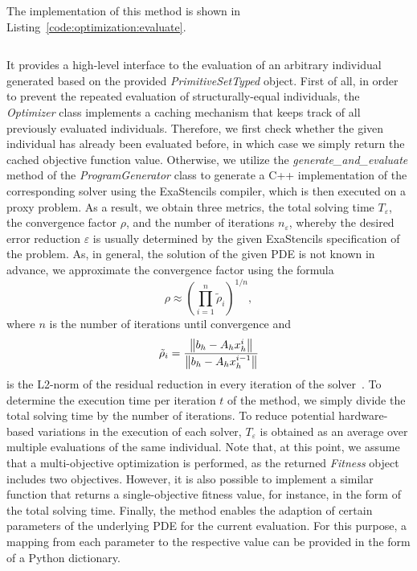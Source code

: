 The implementation of this method is shown in Listing~\ref{code:optimization:evaluate}.
\begin{listing}
	\inputminted[fontsize=\footnotesize,breaklines]{scala}{evostencils/optimization/evaluate.py}
	\caption{}
	\label{code:optimization:evaluate}
\end{listing}
It provides a high-level interface to the evaluation of an arbitrary individual generated based on the provided \emph{PrimitiveSetTyped} object.
First of all, in order to prevent the repeated evaluation of structurally-equal individuals, the \emph{Optimizer} class implements a caching mechanism that keeps track of all previously evaluated individuals.
Therefore, we first check whether the given individual has already been evaluated before, in which case we simply return the cached objective function value.
Otherwise, we utilize the \emph{generate\_and\_evaluate} method of the \emph{ProgramGenerator} class to generate a C++ implementation of the corresponding solver using the ExaStencils compiler, which is then executed on a proxy problem.
As a result, we obtain three metrics, the total solving time $T_\varepsilon$, the convergence factor $\rho$, and the number of iterations $n_\varepsilon$, whereby the desired error reduction $\varepsilon$ is usually determined by the given ExaStencils specification of the problem.
As, in general, the solution of the given PDE is not known in advance, we approximate the convergence factor using the formula
\begin{equation}\label{eq:asymptotic_convergence_factor}
	\rho \approx \left(\prod_{i=1}^{n}\tilde{\rho}_i \right)^{1/n},
\end{equation} where $n$ is the number of iterations until convergence and
\begin{equation*}
	\tilde{\rho}_{i} = \frac{\norm{b_h - A_h x_{h}^i }}{\norm{b_h - A_h x^{i-1}_{h}}}
\end{equation*}
is the L2-norm of the residual reduction in every iteration of the solver~\cite{trottenberg2000multigrid}.
To determine the execution time per iteration $t$ of the method, we simply divide the total solving time by the number of iterations.
To reduce potential hardware-based variations in the execution of each solver, $T_\varepsilon$ is obtained as an average over multiple evaluations of the same individual.
Note that, at this point, we assume that a multi-objective optimization is performed, as the returned \emph{Fitness} object includes two objectives.
However, it is also possible to implement a similar function that returns a single-objective fitness value, for instance, in the form of the total solving time.
Finally, the method enables the adaption of certain parameters of the underlying PDE for the current evaluation.
For this purpose, a mapping from each parameter to the respective value can be provided in the form of a Python dictionary.

